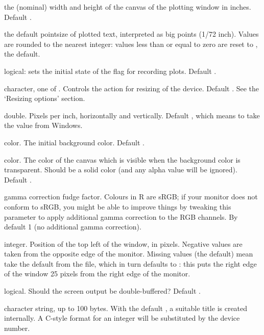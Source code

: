 \begin{Arguments}
\begin{ldescription}
\item[\code{width, height}] the (nominal) width and height of the canvas of
the plotting window in inches.  Default .
\item[\code{pointsize}] the default pointsize of plotted text, interpreted as
big points (1/72 inch).  Values are rounded to the nearest integer:
values less than or equal to zero are reset to , the
default.
\item[\code{record}] logical: sets the initial state of the flag for
recording plots.  Default .
\item[\code{rescale}] character, one of .
Controls the action for resizing of the device.  Default
.  See the `Resizing options' section.
\item[\code{xpinch, ypinch}] double.  Pixels per inch, horizontally and
vertically.  Default , which means to take the
value from Windows.
\item[\code{bg}] color.  The initial background color.  Default
.
\item[\code{canvas}] color.  The color of the canvas which is visible
when the background color is transparent.  Should be a solid color
(and any alpha value will be ignored).  Default .
\item[\code{gamma}] gamma correction fudge factor.
Colours in R are sRGB;  if your monitor does not conform to
sRGB, you might be able to improve things by tweaking this
parameter to apply additional gamma correction to the RGB channels.
By default 1 (no additional gamma correction).
\item[\code{xpos, ypos}] integer.  Position of the top left of the window, in
pixels.  Negative values are taken from the opposite edge of the
monitor.  Missing values (the default) mean take the default from the
 file, which in turn defaults to
: this puts the right edge of the window 25
pixels from the right edge of the monitor.
\item[\code{buffered}] logical.  Should the screen output be double-buffered?
Default .
\item[\code{title}] character string, up to 100 bytes.  With the default
, a suitable title is created internally.  A C-style format
for an integer will be substituted by the device number.

\end{ldescription}
\end{Arguments}
